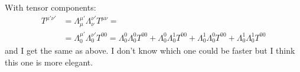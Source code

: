 With tensor components:
\begin{align*}
	T^{\mu \prime \nu \prime } &= \Lambda ^{\mu \prime }_{\mu }\Lambda ^{\nu \prime }_{\nu } T^{\mu \nu } = \\
				   &= \Lambda ^{\mu \prime }_{0}\Lambda ^{\nu \prime }_{0}T^{00} = \Lambda ^{0}_{0}\Lambda ^{0}_{0}T^{00}+\Lambda ^{0}_{0}\Lambda ^{1}_{0}T^{00} + \Lambda ^{1}_{0}\Lambda ^{0}_{0}T^{00}+ \Lambda ^{1}_{0}\Lambda ^{1}_{0}T^{00} 
\end{align*}
and I get the same as above. I don't know which one could be faster but I think this one is more elegant. 





























